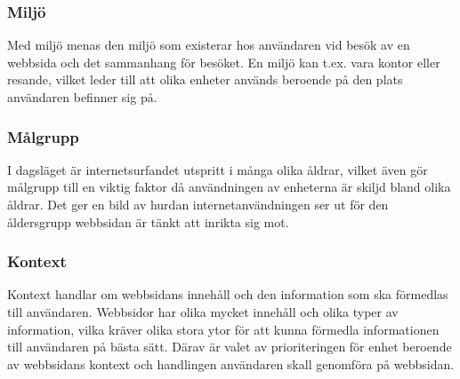 \documentclass[11pt]{article}
\begin{document}
\subsubsection{Miljö}
Med miljö menas den miljö som existerar hos användaren vid besök av en webbsida och det sammanhang för besöket. En miljö kan t.ex. vara kontor eller resande, vilket leder till att olika enheter används beroende på den plats användaren befinner sig på.

\subsubsection{Målgrupp}
I dagsläget är internetsurfandet utspritt i många olika åldrar, vilket även gör målgrupp till en viktig faktor då användningen av enheterna är skiljd bland olika åldrar. Det ger en bild av hurdan internetanvändningen ser ut för den åldersgrupp webbsidan är tänkt att inrikta sig mot.

\subsubsection{Kontext}
Kontext handlar om webbsidans innehåll och den information som ska förmedlas till användaren. Webbsidor har olika mycket innehåll och olika typer av information, vilka kräver olika stora ytor för att kunna förmedla informationen till användaren på bästa sätt.  Därav är valet av prioriteringen för enhet beroende av webbsidans kontext och handlingen användaren skall genomföra på webbsidan.
\end{document}

